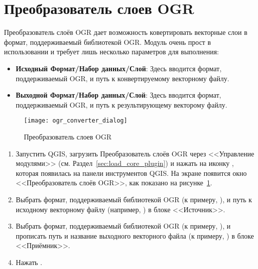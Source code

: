 
\section{Преобразователь слоев OGR}


Преобразователь слоёв OGR дает возможность ковертировать векторные слои
в формат, поддерживаемый библиотекой OGR.  Модуль очень прост в использовании и требует лишь несколько
параметров для выполнения:

\begin{itemize}[label=--]
\item \textbf{Исходный Формат/Набор данных/Слой}: Здесь вводится
формат, поддерживаемый OGR, и путь к конвертируемому векторному файлу.
\item \textbf{Выходной Формат/Набор данных/Слой}: Здесь вводится
формат, поддерживаемый OGR, и путь к результирующему векторому файлу.
\end{itemize}

\begin{figure}[ht]
 \centering
   \texttt{[image: ogr\_converter\_dialog]}
   \caption{Преобразователь слоев OGR \nixcaption}\label{fig:ogr_converter_dialog}
\end{figure}


\begin{enumerate}
  \item Запустить QGIS, загрузить Преобразователь слоёв OGR через
  <<Управление модулями>> (см. Раздел~\ref{sec:load_core_plugin}) и
  нажать на иконку ,
  которая появилась на панели инструментов QGIS. На экране появится окно
  <<Преобразователь слоёв OGR>>, как показано на рисунке~\ref{fig:ogr_converter_dialog}.
  \item Выбрать формат, поддерживаемый библиотекой OGR (к примеру,
  ), и путь к исходному
  векторному файлу (например, ) в блоке <<Источник>>.
  \item Выбрать формат, поддерживаемый библиотекой OGR (к примеру,
  ), и прописать путь и название выходного
  векторного файла (к примеру, ) в блоке <<Приёмник>>.
  \item Нажать .
\end{enumerate}

\FloatBarrier
